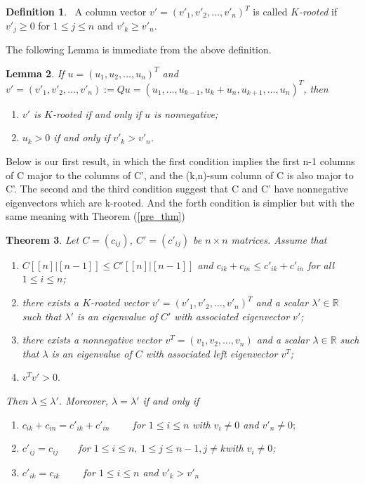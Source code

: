 \documentclass{article}
\theoremstyle{plain}
\newtheorem{thm}{Theorem}[section]
\newtheorem{lem}[thm]{Lemma}
\theoremstyle{definition}
\newtheorem{defn}[thm]{Definition}
\begin{document}
\begin{defn}%
~A column vector $v'=(v'_1,v'_2,\ldots,v'_n)^T$ is called {\it $K$-rooted}  if $v'_{j} \geq 0$ for $1 \leq  j \leq n$ and $v'_k\geq v'_n.$
\end{defn}
\bigskip

The following Lemma is immediate from the above definition.%
\bigskip

\begin{lem}\label{lem:rt_vec}
If $u=(u_1, u_2, \ldots, u_n)^T$ and $v'=(v'_1, v'_2, \ldots, v'_n):=Qu=(u_1,\ldots, u_{k-1},u_k+u_n, u_{k+1}, \ldots,  u_n)^T$, then
\begin{enumerate}[label=(\roman*)]
\item \label{lem:rt_vec:en1}$v'$ is $K$-rooted  if and only if  $u$ is nonnegative;
\item $u_k>0$ if and only if $v'_k>v'_n$.
\end{enumerate}
\end{lem}

Below is our first result, in which the first condition implies the first n-1 columns of C major to
 the columns of C', and the (k,n)-sum column of C is also major to C'. The second and the third condition
 suggest that C and C' have nonnegative eigenvectors which are k-rooted. And the forth condition is simplier
  but with the same meaning with Theorem (\ref{pre_thm})
\begin{thm}\label{thm_main}
    Let $C=(c_{ij})$, $C'=(c'_{ij})$ be  $n\times n$ matrices.
Assume that
\begin{enumerate}[label=(\roman*)]
\item \label{thm_main:condition_i} $C[[n]|[n-1]]\leq C'[[n]|[n-1]]$ and $c_{ik}+c_{in}\leq c'_{ik}+c'_{in}$ for all $1\leq i\leq n$;
\item \label{thm_main:condition_ii} there exists a $K$-rooted vector $v'=(v'_1, v'_2, \ldots, v'_n)^T$ and a scalar $\lambda'\in \mathbb{R}$
such that $\lambda'$ is an eigenvalue of $C'$ with associated eigenvector $v'$;
\item \label{thm_main:condition_iii}there exists a nonnegative vector $v^T=(v_1, v_2, \ldots, v_n)$ and a scalar $\lambda\in \mathbb{R}$ such that $\lambda$ is an eigenvalue of $C$ with associated left eigenvector $v^T$;
\item \label{thm_main:condition_iv}$v^Tv'>0.$
\end{enumerate}
 Then $\lambda\leq \lambda'$.
Moreover, $\lambda=\lambda'$
if and only if
\begin{enumerate}[label=(\alph*)]
    \item \label{thm_main:equ_cond_a} $c_{ik}+c_{in}=c'_{ik}+c'_{in} \qquad$  for $1\leq i\leq n$ with $v_i\not=0$ and $v'_n\not=0;$
    \item \label{thm_main:equ_cond_b} $c'_{ij}=c_{ij}\qquad $for $1\leq i\leq n,~1\leq j\leq n-1, j \neq k $with $v_i\ne 0 $;
    \item \label{thm_main:equ_cond_c} $c'_{ik}=c_{ik} \qquad $  for $1\leq i \leq n$ and $ v'_{k}>v'_n$ 
\end{enumerate} %
\end{thm}
% 
\end{document}
